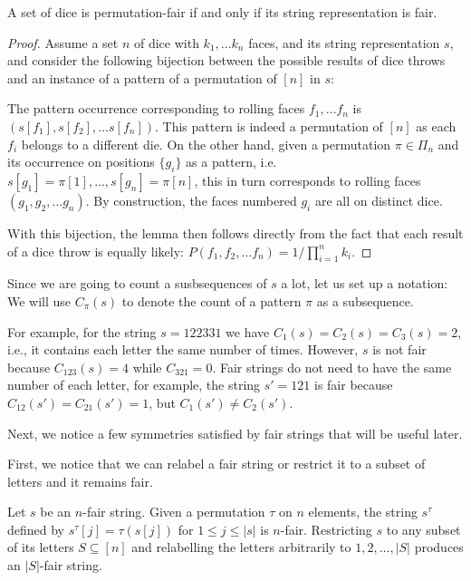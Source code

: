 \documentclass{article}
\begin{document}
\begin{lemma}
\label{lem:equivalence}
    A set of dice is permutation-fair if and only if its string representation is fair.
\end{lemma}
\begin{proof}
   Assume a set $n$ of dice with $k_1, \dots k_n$ faces, and its string representation $s$, and consider the following bijection between the possible results of dice throws and an instance of a pattern of a permutation of $[n]$ in $s$:
   
   The pattern occurrence corresponding to rolling faces $f_1, \dots f_n$ is $(s[f_1], s[f_2], \dots s[f_n])$. This pattern is indeed a permutation of $[n]$ as each $f_i$ belongs to a different die. On the other hand, given a permutation $\pi\in\Pi_n$ and its occurrence on positions $\{g_i\}$ as a pattern, i.e. $s[g_1]=\pi[1], \dots, s[g_n]=\pi[n]$, this in turn corresponds to rolling faces $(g_1, g_2, \dots g_n)$. By construction, the faces numbered $g_i$ are all on distinct dice.

   With this bijection, the lemma then follows directly from the fact that each result of a dice throw is equally likely: $P(f_1, f_2, \dots f_n) = 1/\prod_{i=1}^n k_i$.
\end{proof}

Since we are going to count a susbsequences of $s$ a lot, let us set up a notation: We will use $C_{\pi}(s)$
to denote the count of a pattern $\pi$ as a subsequence. 

For example, for the string $s = 122331$ we have $C_{1}(s) = C_{2}(s) = C_3(s) = 2$, i.e., it contains each letter the same number of times. However, $s$ is not fair because $C_{123}(s) = 4$ while $C_{321} = 0$. Fair strings do not need to have the same number of each letter, for example, the string $s' = 121$ is fair because $C_{12}(s') = C_{21}(s') = 1$, but $C_{1}(s') \not= C_2(s')$. 

Next, we notice a few symmetries satisfied by fair strings that will be useful later. 

First, we notice that we can relabel a fair string or restrict it to a subset of letters and it remains fair. 
\begin{claim}
\label{cl:relabeling}
    Let $s$ be an $n$-fair string. Given a permutation $\tau$ on $n$ elements, the string $s^\tau$
    defined by $s^\tau[j] = \tau(s[j])$ for $1 \le j \le |s|$ is $n$-fair. 
    Restricting $s$ to any subset of its letters $S \subseteq [n]$ and relabelling the letters arbitrarily to $1, 2, \dots, |S|$ produces an $|S|$-fair string. 
\end{claim}
\end{document}
